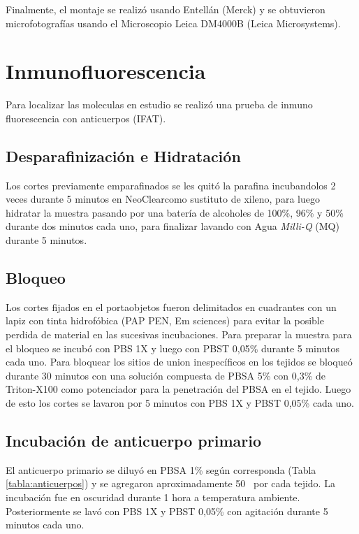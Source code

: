 \documentclass[12pt,letterpaper,oneside]{scrbook}
\begin{document}
Finalmente, el montaje se realizó usando Entellán (Merck) y se
obtuvieron microfotografías usando el Microscopio Leica DM4000B (Leica
Microsystems).

\section{Inmunofluorescencia}\label{sec:ifat}

Para localizar las moleculas en estudio se realizó una prueba de inmuno
fluorescencia con anticuerpos (IFAT).

\subsection{Desparafinización e Hidratación}

Los cortes previamente emparafinados se les quitó la parafina
incubandolos 2 veces durante 5 minutos en NeoClear\textregistered como
sustituto de xileno, para luego hidratar la muestra pasando por una
batería de alcoholes de 100\%, 96\% y 50\% durante dos minutos cada uno,
para finalizar lavando con Agua \emph{Milli-Q} (MQ) durante 5 minutos.

\subsection{Bloqueo}

Los cortes fijados en el portaobjetos fueron delimitados en cuadrantes
con un lapiz con tinta hidrofóbica (PAP PEN, Em sciences) para evitar la
posible perdida de material en las sucesivas incubaciones. Para preparar
la muestra para el bloqueo se incubó con PBS 1X y luego con PBST 0,05\%
durante 5 minutos cada uno. Para bloquear los sitios de union
inespecíficos en los tejidos se bloqueó durante 30 minutos con una
solución compuesta de PBSA 5\% con 0,3\% de Triton-X100 como potenciador
para la penetración del PBSA en el tejido. Luego de esto los cortes se
lavaron por 5 minutos con PBS 1X y PBST 0,05\% cada uno.

\subsection{Incubación de anticuerpo primario}

El anticuerpo primario se diluyó en PBSA 1\% según corresponda (Tabla
\ref{tabla:anticuerpos}) y se agregaron aproximadamente
50\si{\micro\litro} por cada tejido. La incubación fue en oscuridad
durante 1 hora a temperatura ambiente. Posteriormente se lavó con PBS 1X
y PBST 0,05\% con agitación durante 5 minutos cada uno.
\end{document}
